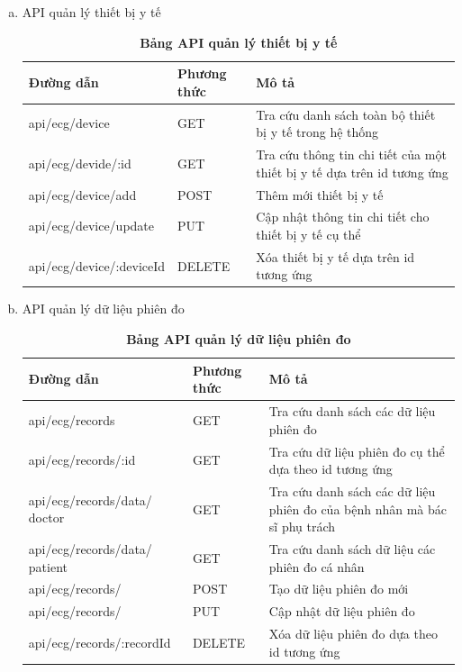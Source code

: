 \begin{enumerate}[a)]
  \item API quản lý thiết bị y tế
  \begin{xltabular}{\textwidth}{
	| >{\raggedright\arraybackslash}m{4.8cm}
	| >{\centering\arraybackslash}m{2.8cm}
	| >{\raggedright\arraybackslash}X |
	}
	\caption{\bfseries \fontsize{12pt}{0pt}\selectfont Bảng API quản lý thiết bị y tế}
	\label{table_api_device}
	\\
	\hline
	\bfseries Đường dẫn    &\bfseries Phương thức    &\bfseries Mô tả\\ \hline
	api/ecg/device   &   GET  & Tra cứu danh sách toàn bộ thiết bị y tế trong hệ thống\\ \hline
	api/ecg/devide/:id   &    GET    & Tra cứu thông tin chi tiết của một thiết bị y tế dựa trên id tương ứng \\ \hline
	api/ecg/device/add &   POST     & Thêm mới thiết bị y tế \\ \hline
	api/ecg/device/update  &     PUT   & Cập nhật thông tin chi tiết cho thiết bị y tế cụ thể \\ \hline
	api/ecg/device/:deviceId  &     DELETE   & Xóa thiết bị y tế dựa trên id tương ứng \\ \hline
  \end{xltabular}
  
  \item API quản lý dữ liệu phiên đo
  \begin{xltabular}{\textwidth}{
	| >{\raggedright\arraybackslash}p{5cm}
	| >{\centering\arraybackslash}m{2.8cm}
	| >{\raggedright\arraybackslash}X |
	}
	\caption{\bfseries \fontsize{12pt}{0pt}\selectfont Bảng API quản lý dữ liệu phiên đo}
	\label{table_api_record}
	\\
	\hline
	\bfseries Đường dẫn    &\bfseries Phương thức    &\bfseries Mô tả \\ \hline
	 api/ecg/records   &   GET  & Tra cứu danh sách các dữ liệu phiên đo \\ \hline
	 api/ecg/records/:id   &    GET    & Tra cứu dữ liệu phiên đo cụ thể dựa theo id tương ứng \\ \hline
	 api/ecg/records/data/ doctor &   GET     & Tra cứu danh sách các dữ liệu phiên đo của bệnh nhân mà bác sĩ phụ trách \\ \hline
	 api/ecg/records/data/ patient &   GET     & Tra cứu danh sách dữ liệu các phiên đo cá nhân \\ \hline
	 api/ecg/records/   &    POST    & Tạo dữ liệu phiên đo mới \\ \hline
	 api/ecg/records/   &    PUT    & Cập nhật dữ liệu phiên đo \\ \hline
	 api/ecg/records/:recordId  &    DELETE    & Xóa dữ liệu phiên đo dựa theo id tương ứng \\ \hline
	\end{xltabular}
  

\end{enumerate}
